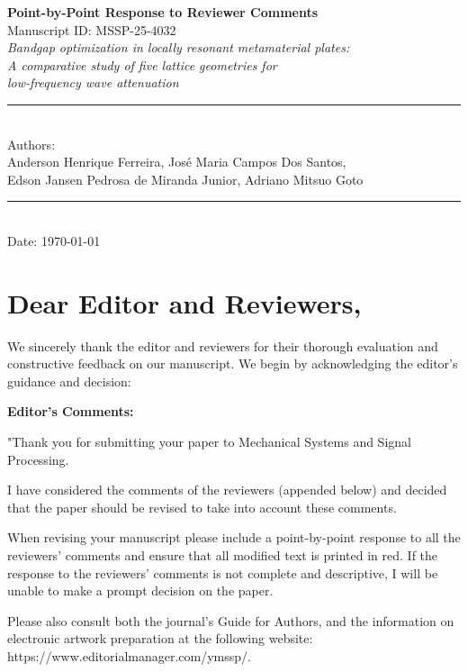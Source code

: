 \documentclass[11pt,a4paper]{article}
\begin{document}
\begin{center}
    {\LARGE \textbf{Point-by-Point Response to Reviewer Comments}}\\[0.5cm]
    {\large Manuscript ID: MSSP-25-4032}\\[0.3cm]
    {\large \textit{Bandgap optimization in locally resonant metamaterial plates:\\
    A comparative study of five lattice geometries for\\
    low-frequency wave attenuation}}\\[0.5cm]
    \rule{\textwidth}{0.4pt}\\[0.3cm]
    {\large Authors:\\
    Anderson Henrique Ferreira, Jos\'{e} Maria Campos Dos Santos,\\
    Edson Jansen Pedrosa de Miranda Junior, Adriano Mitsuo Goto}\\[0.3cm]
    \rule{\textwidth}{0.4pt}\\[0.5cm]
    {\large Date: \today}
\end{center}

\vspace{1cm}

\section*{Dear Editor and Reviewers,}

We sincerely thank the editor and reviewers for their thorough evaluation and constructive feedback on our manuscript. We begin by acknowledging the editor's guidance and decision:

\textbf{Editor's Comments:}

"Thank you for submitting your paper to Mechanical Systems and Signal Processing.

I have considered the comments of the reviewers (appended below) and decided that the paper should be revised to take into account these comments.

When revising your manuscript please include a point-by-point response to all the reviewers' comments and ensure that all modified text is printed in red. If the response to the reviewers' comments is not complete and descriptive, I will be unable to make a prompt decision on the paper.

Please also consult both the journal's Guide for Authors, and the information on electronic artwork preparation at the following website: https://www.editorialmanager.com/ymssp/.
\end{document}
